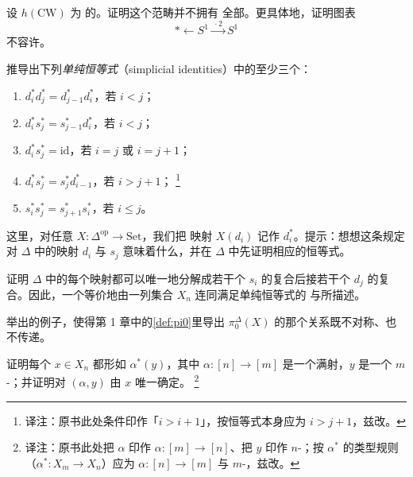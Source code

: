 
\begin{exercise}\label{ex:cw-no-pushouts}
设 $h(\mathrm{CW})$ 为 \trCWComplex{}的\trHomotopyCategory{}。证明这个范畴并不拥有
全部\trPushout{}。更具体地，证明图表
\[
\ast \longleftarrow S^1 \xrightarrow{\ \cdot 2\ } S^1
\]
不容许\trPushout{}。
\end{exercise}

\begin{exercise}\label{ex:simplicial-identities}
推导出下列\emph{单纯恒等式}（simplicial identities）中的至少三个：
\begin{enumerate}[label=(\arabic*)]
  \item $d_i^* d_j^* = d_{j-1}^* d_i^*$，若 $i < j$；
  \item $d_i^* s_j^* = s_{j-1}^* d_i^*$，若 $i < j$；
  \item $d_i^* s_j^* = \mathrm{id}$，若 $i = j$ 或 $i = j + 1$；
  \item $d_i^* s_j^* = s_j^* d_{i-1}^*$，若 $i > j + 1$；%
  \footnote{译注：原书此处条件印作「$i > i + 1$」，按恒等式本身应为
  $i > j + 1$，兹改。}
  \item $s_i^* s_j^* = s_{j+1}^* s_i^*$，若 $i \le j$。
\end{enumerate}
这里，对任意\trSimplicialSet{} $X\colon \Delta^{\mathrm{op}} \to \mathrm{Set}$，我们把
映射 $X(d_i)$ 记作 $d_i^*$。提示：想想这条规定对 $\Delta$ 中的映射 $d_i$ 与 $s_j$
意味着什么，并在 $\Delta$ 中先证明相应的恒等式。
\end{exercise}

\begin{exercise}\label{ex:delta-epi-mono-factorization}
证明 $\Delta$ 中的每个映射都可以唯一地分解成若干个 $s_i$ 的复合后接若干个 $d_j$
的复合。因此，一个\trSimplicialSet{}等价地由一列集合 $X_n$ 连同满足单纯恒等式的%
\trFaceMap{}与\trDegeneracyMap{}所描述。
\end{exercise}

\begin{exercise}\label{ex:pi0-relation-not-equivalence}
举出\trSimplicialSet{}的例子，使得第 1 章中的\cref{def:pi0}里导出
$\pi^{\Delta}_0(X)$ 的那个关系既不对称、也不传递。
\end{exercise}

\begin{exercise}\label{ex:eilenberg-zilber}
证明每个\trSimplex{} $x \in X_n$ 都形如 $\alpha^*(y)$，其中 $\alpha\colon [n] \to [m]$
是一个满射，$y$ 是一个\trNonDegenerate{} $m$-\trSimplex{}；并证明对 $(\alpha, y)$ 由 $x$
唯一确定。%
\footnote{译注：原书此处把 $\alpha$ 印作 $\alpha\colon [m] \to [n]$、把 $y$ 印作%
\trNonDegenerate{}%
$n$-\trSimplex{}；按 $\alpha^*$ 的类型规则（$\alpha^*\colon X_m \to X_n$）应为
$\alpha\colon [n] \to [m]$ 与\trNonDegenerate{} $m$-\trSimplex{}，兹改。}
\end{exercise}

